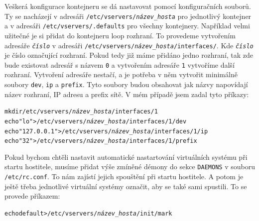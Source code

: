 Veškerá konfigurace kontejneru se dá nastavovat pomocí konfiguračních souborů. Ty se nacházejí v adresáři \texttt{/etc/vservers/\textit{název\_hosta}} pro jednotlivý kontejner a v adresáři \texttt{/etc/vservers/.defaults} pro všechny kontejnery. Například velmi užitečné je si přidat do kontejneru loop rozhraní. To provedeme vytvořením adresáře \texttt{\textit{číslo}} v adresáři \texttt{/etc/vservers/\textit{název\_hosta}/interfaces/}. Kde \texttt{\textit{číslo}} je číslo označující rozhraní. Pokud tedy již máme přidáno jedno rozhraní, tak zde bude existovat adresář s názvem \texttt{0} a vytvořením adresáře \texttt{1} vytvoříme další rozhraní. Vytvoření adresáře nestačí, a je potřeba v něm vytvořit minimálně soubory \texttt{dev}, \texttt{ip} a  \texttt{prefix}. Tyto soubory budou obsahovat jak názvy napovídají název rozhraní, IP adresu a prefix sítě. V mém případě jsem zadal tyto příkazy:
\begin{alltt}
  mkdir /etc/vservers/\emph{název\_hosta}/interfaces/1
  echo "lo" > /etc/vservers/\emph{název\_hosta}/interfaces/1/dev
  echo "127.0.0.1" > /etc/vservers/\emph{název\_hosta}/interfaces/1/ip
  echo "32" > /etc/vservers/\emph{název\_hosta}/interfaces/1/prefix
\end{alltt}

Pokud bychom chtěli nastavit automatické nastartování virtuálních systému při startu hostitele, musíme přidat výše zmíněné démony do sekce \texttt{DAEMONS} v souboru \texttt{/etc/rc.conf}. To nám zajístí jejich spouštění při startu hostitele. A potom je ještě třeba jednotlivé virtuální systémy označit, aby se také sami spustili. To se provede příkazem:
\begin{alltt}
  echo default > /etc/vservers/\emph{název\_hosta}/init/mark
\end{alltt}
